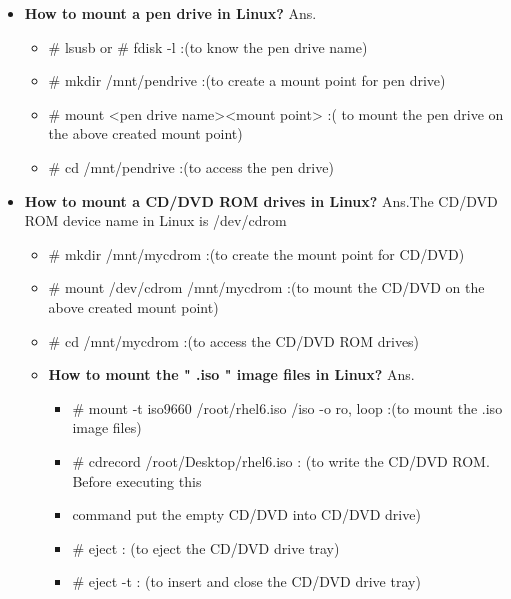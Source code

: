 \begin{enumerate}
\begin{enumerate}
{\begin{itemize}
    \bigskip
    \bigskip

    \item \textbf{How to mount a pen drive in Linux?}
    \newline
    Ans.\begin{itemize}
           \item # lsusb or # fdisk -l  :(to know the pen drive name)
           \item # mkdir  /mnt/pendrive	:(to create a mount point for pen drive)
           \item# mount <pen drive name><mount point> :( to mount the pen drive on the above created mount point)
           \item # cd /mnt/pendrive :(to access the pen drive)
        \end{itemize}
    
    \bigskip
    \bigskip

    \item \textbf{How to mount a CD/DVD ROM drives in Linux?}
    \newline
    Ans.The CD/DVD ROM device name in Linux is  /dev/cdrom
        \begin{itemize}
          \item # mkdir /mnt/mycdrom	:(to create the mount point for CD/DVD)
          \item # mount /dev/cdrom /mnt/mycdrom	:(to mount the CD/DVD on the above created mount point)
          \item # cd /mnt/mycdrom :(to access the CD/DVD ROM drives)
    
    \bigskip
    \bigskip

    \item \textbf{How to mount the  " .iso "  image files in Linux?}
    \newline
    Ans.  \begin{itemize}
            \item # mount   -t   iso9660    /root/rhel6.iso   /iso  -o  ro, loop	:(to mount the .iso image files)
	          \item  # cdrecord   /root/Desktop/rhel6.iso 	: (to write the CD/DVD ROM. Before executing this 
            \item command put the empty CD/DVD into CD/DVD drive)
	          \item # eject  		:	(to eject the CD/DVD drive tray)
	          \item # eject   -t	:	(to insert and close the CD/DVD drive tray)
           \end{itemize}


\end{itemize}
\end{itemize}}
\end{enumerate}
\end{enumerate}
